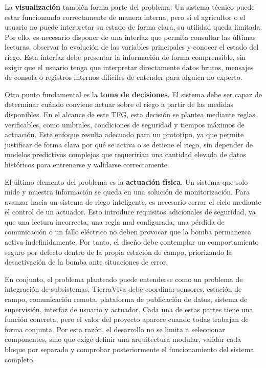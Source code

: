 La \textbf{visualización} también forma parte del problema. Un sistema técnico puede estar funcionando correctamente de manera interna, pero si el agricultor o el usuario no puede interpretar su estado de forma clara, su utilidad queda limitada. Por ello, es necesario disponer de una interfaz que permita consultar las últimas lecturas, observar la evolución de las variables principales y conocer el estado del riego. Esta interfaz debe presentar la información de forma comprensible, sin exigir que el usuario tenga que interpretar directamente datos brutos, mensajes de consola o registros internos difíciles de entender para alguien no experto.

Otro punto fundamental es la \textbf{toma de decisiones}. El sistema debe ser capaz de determinar cuándo conviene actuar sobre el riego a partir de las medidas disponibles. En el alcance de este TFG, esta decisión se plantea mediante reglas verificables, como umbrales, condiciones de seguridad y tiempos máximos de actuación. Este enfoque resulta adecuado para un prototipo, ya que permite justificar de forma clara por qué se activa o se detiene el riego, sin depender de modelos predictivos complejos que requerirían una cantidad elevada de datos históricos para entrenarse y validarse correctamente.

El último elemento del problema es la \textbf{actuación física}. Un sistema que solo mide y muestra información se queda en una solución de monitorización. Para avanzar hacia un sistema de riego inteligente, es necesario cerrar el ciclo mediante el control de un actuador. Esto introduce requisitos adicionales de seguridad, ya que una lectura incorrecta, una regla mal configurada, una pérdida de comunicación o un fallo eléctrico no deben provocar que la bomba permanezca activa indefinidamente. Por tanto, el diseño debe contemplar un comportamiento seguro por defecto dentro de la propia estación de campo, priorizando la desactivación de la bomba ante situaciones de error.

En conjunto, el problema planteado puede entenderse como un problema de integración de subsistemas. TierraViva debe coordinar sensores, estación de campo, comunicación remota, plataforma de publicación de datos, sistema de supervisión, interfaz de usuario y actuador. Cada una de estas partes tiene una función concreta, pero el valor del proyecto aparece cuando todas trabajan de forma conjunta. Por esta razón, el desarrollo no se limita a seleccionar componentes, sino que exige definir una arquitectura modular, validar cada bloque por separado y comprobar posteriormente el funcionamiento del sistema completo.


